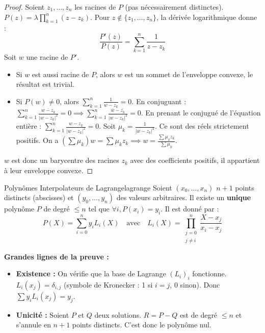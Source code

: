 \documentclass{prepacours}
\begin{document}
\begin{proof}
    Soient $z_1, \dots, z_n$ les racines de $P$ (pas nécessairement distinctes).
    $P(z) = \lambda \prod_{k=1}^n (z - z_k)$.
    Pour $z \notin \{z_1, \dots, z_n\}$, la dérivée logarithmique donne :
    \[ \frac{P'(z)}{P(z)} = \sum_{k=1}^n \frac{1}{z - z_k} \]
    Soit $w$ une racine de $P'$.
    \begin{itemize}
        \item Si $w$ est aussi racine de $P$, alors $w$ est un sommet de l'enveloppe convexe, le résultat est trivial.
        \item Si $P(w) \neq 0$, alors $\sum_{k=1}^n \frac{1}{w - z_k} = 0$.
        En conjuguant : $\sum_{k=1}^n \frac{\overline{w - z_k}}{|w - z_k|^2} = 0 \implies \sum_{k=1}^n \frac{\bar{w} - \bar{z_k}}{|w - z_k|^2} = 0$.
        En prenant le conjugué de l'équation entière : $\sum_{k=1}^n \frac{w - z_k}{|w - z_k|^2} = 0$.
        Soit $\mu_k = \frac{1}{|w - z_k|^2}$. Ce sont des réels strictement positifs.
        On a $(\sum \mu_k) w = \sum \mu_k z_k \implies w = \frac{\sum \mu_k z_k}{\sum \mu_k}$.
    \end{itemize}
    $w$ est donc un barycentre des racines $z_k$ avec des coefficients positifs, il appartient à leur enveloppe convexe.
\end{proof}

\begin{proposition}{Polynômes Interpolateurs de Lagrange}{lagrange}
    Soient $(x_0, \dots, x_n)$ $n+1$ points distincts (abscisses) et $(y_0, \dots, y_n)$ des valeurs arbitraires.
    Il existe un \textbf{unique} polynôme $P$ de degré $\le n$ tel que $\forall i, P(x_i) = y_i$.
    Il est donné par :
    \[ P(X) = \sum_{i=0}^n y_i L_i(X) \quad \text{avec} \quad L_i(X) = \prod_{\substack{j=0 \\ j \neq i}}^n \frac{X - x_j}{x_i - x_j} \]
\end{proposition}

\noindent \textbf{Grandes lignes de la preuve :}
\begin{itemize}
    \item \textbf{Existence :} On vérifie que la base de Lagrange $(L_i)_i$ fonctionne. $L_i(x_j) = \delta_{i,j}$ (symbole de Kronecker : 1 si $i=j$, 0 sinon). Donc $\sum y_i L_i(x_j) = y_j$.
    \item \textbf{Unicité :} Soient $P$ et $Q$ deux solutions. $R = P-Q$ est de degré $\le n$ et s'annule en $n+1$ points distincts. C'est donc le polynôme nul.
\end{itemize}
\end{document}
